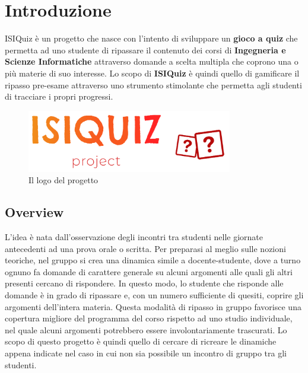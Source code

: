 

\chapter{Introduzione}
ISIQuiz è un progetto che nasce con l'intento di sviluppare un \textbf{gioco a quiz} che permetta ad uno studente di ripassare il contenuto dei corsi di \textbf{Ingegneria e Scienze Informatiche} attraverso domande a scelta multipla che coprono una o più materie di suo interesse. Lo scopo di \textbf{ISIQuiz} è quindi quello di gamificare il ripasso pre-esame attraverso uno strumento stimolante che permetta agli studenti di tracciare i propri progressi.
\begin{figure}[H]
    \label{fig:Logo}
    \centering
    \includegraphics[width=0.8\textwidth]{Extra/ISIQuizLogoLineTransparent.png}
    \caption{Il logo del progetto}
\end{figure}

\section{Overview}
L'idea è nata dall'osservazione degli incontri tra studenti nelle giornate antecedenti ad una prova orale o scritta. Per preparasi al meglio sulle nozioni teoriche, nel gruppo si crea una dinamica simile a docente-studente, dove a turno ognuno fa domande di carattere generale su alcuni argomenti alle quali gli altri presenti cercano di rispondere. In questo modo, lo studente che risponde alle domande è in grado di ripassare e, con un numero sufficiente di quesiti, coprire gli argomenti dell'intera materia. Questa modalità di ripasso in gruppo favorisce una copertura migliore del programma del corso rispetto ad uno studio individuale, nel quale alcuni argomenti potrebbero essere involontariamente trascurati.
Lo scopo di questo progetto è quindi quello di cercare di ricreare le dinamiche appena indicate nel caso in cui non sia possibile un incontro di gruppo tra gli studenti.